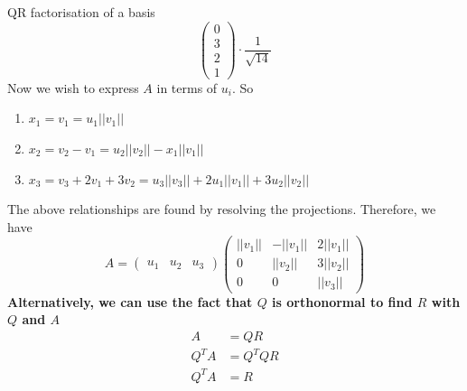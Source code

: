 \documentclass[journal, letterpaper]{IEEEtran}
\begin{document}
\begin{myboxg}{QR factorisation of a basis}
$$\begin{pmatrix}
            0 \\ 3 \\ 2 \\ 1
        \end{pmatrix} \cdot \frac{1}{\sqrt{14}}
        $$
        Now we wish to express $A$ in terms of $u_i$.
        So
        \begin{enumerate}
            \item $x_1 = v_1 = u_1 ||v_1||$
            \item $x_2 = v_2 - v_1 = u_2||v_2|| - x_1||v_1||$
            \item $x_3 = v_3 + 2v_1 + 3v_2 = u_3||v_3|| + 2u_1||v_1|| + 3u_2||v_2||$
        \end{enumerate}
        The above relationships are found by resolving the projections.
        Therefore, we have
        $$ 
        A = \begin{pmatrix}
            u_1 & u_2 & u_3
        \end{pmatrix} \begin{pmatrix}
            ||v_1|| & -||v_1|| & 2||v_1|| \\ 
            0 & ||v_2|| & 3||v_2|| \\ 
            0 & 0 & ||v_3||
        \end{pmatrix}
        $$
        \textbf{Alternatively, we can use the fact that $Q$ is orthonormal to find $R$ with $Q$ and $A$}
        \begin{align*}
            A &= QR \\
            Q^TA &= Q^TQR \\ 
            Q^TA &= R
        \end{align*} 
    \end{myboxg} 
\end{document}

